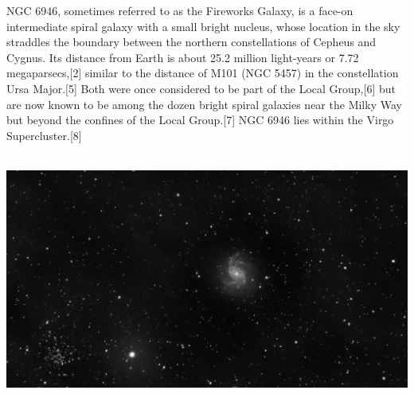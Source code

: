 {\footnotesize\color{white}
NGC 6946, sometimes referred to as the Fireworks Galaxy, is a face-on intermediate spiral galaxy with a small bright nucleus, whose location in the sky straddles the boundary between the northern constellations of Cepheus and Cygnus. Its distance from Earth is about 25.2 million light-years or 7.72 megaparsecs,[2] similar to the distance of M101 (NGC 5457) in the constellation Ursa Major.[5] Both were once considered to be part of the Local Group,[6] but are now known to be among the dozen bright spiral galaxies near the Milky Way but beyond the confines of the Local Group.[7] NGC 6946 lies within the Virgo Supercluster.[8]


}\ \\
\includegraphics[width=\textwidth]{../Imaging//Grayscale/Fireworks_Galaxy.jpg}
